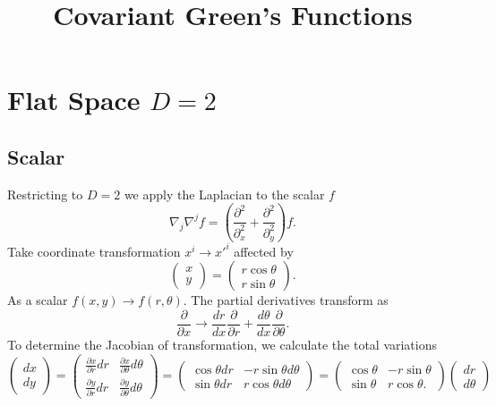 \documentclass[10pt,letterpaper]{article}
\title{Covariant Green's Functions }
\date{}
\begin{document}
\maketitle
\noindent 
\section{Flat Space $D=2$}


\subsection{Scalar}
Restricting to $D=2$ we apply the Laplacian to the scalar $f$
\begin{equation}
\nabla_j \nabla^j f = \left( \frac{\partial^2}{\partial_x ^2} + \frac{\partial^2}{\partial_y^2} \right)f.
\end{equation}
Take coordinate transformation $x^i \to x'^i$ affected by
\begin{equation}
	\begin{pmatrix}
		x\\y
	\end{pmatrix}
	=
	\begin{pmatrix}
		r\cos\theta\\ r\sin\theta	
	\end{pmatrix}.
\end{equation}
As a scalar $f(x,y) \to f(r,\theta)$. The partial derivatives transform as
\begin{equation}
 \frac{\partial}{\partial x} \to \frac{dr}{dx} \frac{\partial}{\partial r} + \frac{d\theta}{dx}\frac{\partial}{\partial \theta}.
\end{equation}
To determine the Jacobian of transformation, we calculate the total variations
\begin{equation}
	\begin{pmatrix}
		dx\\dy
	\end{pmatrix}
	= 
	\begin{pmatrix}
		\frac{\partial x}{\partial r}dr&\frac{\partial x}{\partial \theta} d\theta \\ \frac{\partial y}{\partial r} dr&\frac{\partial y}{\partial \theta} d\theta	
	\end{pmatrix}
	=
	\begin{pmatrix}
		\cos\theta dr&-r\sin\theta d\theta \\ \sin\theta dr&r\cos\theta d\theta	
	\end{pmatrix}
	= 
	\begin{pmatrix}
		\cos\theta&-r\sin\theta  \\ \sin\theta&r\cos\theta.
	\end{pmatrix}
	\begin{pmatrix}
		dr\\d\theta
	\end{pmatrix}
\end{equation}
\end{document}
